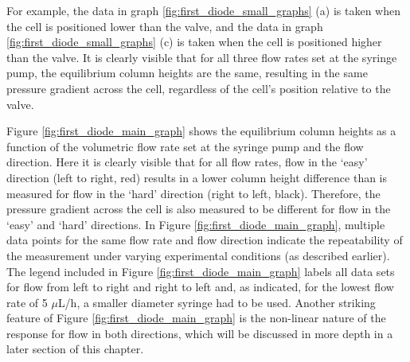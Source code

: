 For example, the data in graph \ref{fig:first_diode_small_graphs} (a) is taken when the cell is positioned lower than the valve, and the data in graph \ref{fig:first_diode_small_graphs} (c) is taken when the cell is positioned higher than the valve. It is clearly visible that for all three flow rates set at the syringe pump, the equilibrium column heights are the same, resulting in the same pressure gradient across the cell, regardless of the cell's position relative to the valve.

Figure \ref{fig:first_diode_main_graph} shows the equilibrium column heights as a function of the volumetric flow rate set at the syringe pump and the flow direction. Here it is clearly visible that for all flow rates, flow in the `easy' direction (left to right, red) results in a lower column height difference than is measured for flow in the `hard' direction (right to left, black). Therefore, the pressure gradient across the cell is also measured to be different for flow in the `easy' and `hard' directions. In Figure \ref{fig:first_diode_main_graph}, multiple data points for the same flow rate and flow direction indicate the repeatability of the measurement under varying experimental conditions (as described earlier). The legend included in Figure \ref{fig:first_diode_main_graph} labels all data sets for flow from left to right and right to left and, as indicated, for the lowest flow rate of 5 $\mu$L/h, a smaller diameter syringe had to be used. Another striking feature of Figure \ref{fig:first_diode_main_graph} is the non-linear nature of the response for flow in both directions, which will be discussed in more depth in a later section of this chapter.

